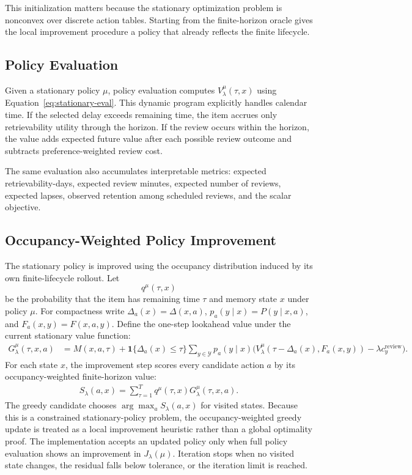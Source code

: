 \documentclass[11pt]{article}
\begin{document}
This initialization matters because the stationary optimization problem is nonconvex over discrete action tables. Starting from the finite-horizon oracle gives the local improvement procedure a policy that already reflects the finite lifecycle.

\subsection{Policy Evaluation}

Given a stationary policy \(\mu\), policy evaluation computes \(V_\lambda^\mu(\tau,x)\) using Equation~\eqref{eq:stationary-eval}. This dynamic program explicitly handles calendar time. If the selected delay exceeds remaining time, the item accrues only retrievability utility through the horizon. If the review occurs within the horizon, the value adds expected future value after each possible review outcome and subtracts preference-weighted review cost.

The same evaluation also accumulates interpretable metrics: expected retrievability-days, expected review minutes, expected number of reviews, expected lapses, observed retention among scheduled reviews, and the scalar objective.

\subsection{Occupancy-Weighted Policy Improvement}

The stationary policy is improved using the occupancy distribution induced by its own finite-lifecycle rollout. Let
\[
q^\mu(\tau,x)
\]
be the probability that the item has remaining time \(\tau\) and memory state \(x\) under policy \(\mu\). For compactness write \(\Delta_a(x)=\Delta(x,a)\), \(p_a(y\mid x)=P(y\mid x,a)\), and \(F_a(x,y)=F(x,a,y)\). Define the one-step lookahead value under the current stationary value function:
\begin{align}
G_\lambda^\mu(\tau,x,a)
&=
M(x,a,\tau)
+
\mathbf{1}\{\Delta_a(x)\le\tau\}
\sum_{y\in\mathcal{Y}} p_a(y\mid x)
\Big(
V_\lambda^\mu(\tau-\Delta_a(x),F_a(x,y))
-\lambda c_y^{\mathrm{review}}
\Big).
\end{align}
For each state \(x\), the improvement step scores every candidate action \(a\) by its occupancy-weighted finite-horizon value:
\begin{align}
S_\lambda(a,x)
=
\sum_{\tau=1}^{T}
q^\mu(\tau,x)
G_\lambda^\mu(\tau,x,a).
\end{align}
The greedy candidate chooses \(\arg\max_a S_\lambda(a,x)\) for visited states. Because this is a constrained stationary-policy problem, the occupancy-weighted greedy update is treated as a local improvement heuristic rather than a global optimality proof. The implementation accepts an updated policy only when full policy evaluation shows an improvement in \(J_\lambda(\mu)\). Iteration stops when no visited state changes, the residual falls below tolerance, or the iteration limit is reached.
\end{document}
